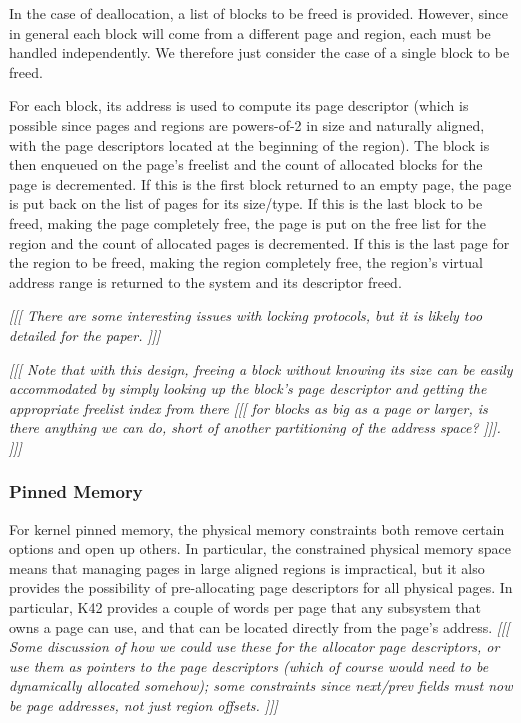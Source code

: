 \documentclass[dvips,11pt]{article}
\newcommand\fixnote[1]{\emph{[[[ #1 ]]]}}
\begin{document}
In the case of deallocation, a list of blocks to be freed is provided.
However, since in general each block will come from a different page and
region, each must be handled independently.  We therefore just consider the 
case of a single block to be freed.

For each block, its address is used to compute its page descriptor (which
is possible since pages and regions are powers-of-2 in size and naturally
aligned, with the page descriptors located at the beginning of the region).
The block is then enqueued on the page's freelist and the count of
allocated blocks for the page is decremented.  If this is the first block
returned to an empty page, the page is put back on the list of pages for
its size/type.  If this is the last block to be freed, making the page
completely free, the page is put on the free list for the region and the
count of allocated pages is decremented.  If this is the last page for the
region to be freed, making the region completely free, the region's virtual
address range is returned to the system and its descriptor freed.

\fixnote{There are some interesting issues with locking protocols, but it
  is likely too detailed for the paper.}

\fixnote{Note that with this design, freeing a block without knowing its
  size can be easily accommodated by simply looking up the block's page
  descriptor and getting the appropriate freelist index from there
  \fixnote{for blocks as big as a page or larger, is there anything we can
    do, short of another partitioning of the address space?}.}


\subsubsection{Pinned Memory}

For kernel pinned memory, the physical memory constraints both remove
certain options and 
open up others.  In particular, the constrained physical memory space means
that managing pages in large aligned regions is impractical, but it also
provides the possibility of pre-allocating page descriptors for all
physical pages.  In particular, K42 provides a couple of words per page
that any subsystem that owns a page can use, and that can be located
directly from the page's address.  \fixnote{Some discussion of
  how we could use these for the allocator page descriptors, or use them as 
  pointers to the page descriptors (which of course would need to be
  dynamically allocated somehow); some constraints since next/prev fields
  must now be page addresses, not just region offsets.}
\end{document}
